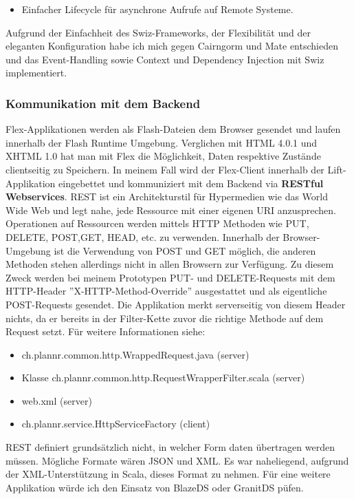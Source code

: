 \begin{itemize}
\begin{itemize}
\begin{lstlisting}[caption=Swiz: Event Observer]
[Mediate( event="Events.SEARCH_USERS", 
          properties="term" )]
public function searchUsers( term:String) : void
{
//...
}
\end{lstlisting}
Hier wird das Property term des geworfenen Events zus\"atzlich der Methode als Argument \"ubergeben.
\item Einfacher Lifecycle f\"ur asynchrone Aufrufe auf Remote Systeme.
\end{itemize}
\end{itemize}

Aufgrund der Einfachheit des Swiz-Frameworks, der Flexibilit\"at und der eleganten Konfiguration habe ich mich gegen Cairngorm und Mate entschieden und das Event-Handling sowie Context und Dependency Injection mit Swiz implementiert.

\subsubsection{Kommunikation mit dem Backend}
Flex-Applikationen werden als Flash-Dateien dem Browser gesendet und laufen innerhalb der Flash Runtime Umgebung. Verglichen mit HTML 4.0.1 und XHTML 1.0 hat man mit Flex die M\"oglichkeit, Daten respektive Zust\"ande clientseitig zu Speichern.
In meinem Fall wird der Flex-Client innerhalb der Lift-Applikation eingebettet und kommuniziert mit dem Backend via \textbf{RESTful Webservices}. REST ist ein Architekturstil f\"ur Hypermedien wie das World Wide Web und legt nahe, jede Ressource mit einer eigenen URI anzusprechen. Operationen auf Ressourcen werden mittels HTTP Methoden  wie PUT, DELETE, POST,GET, HEAD, etc. zu verwenden.\cite{wiki:rest} Innerhalb der Browser-Umgebung ist die Verwendung von POST und GET m\"oglich, die anderen Methoden stehen allerdings nicht in allen Browsern zur Verf\"ugung. Zu diesem Zweck werden bei meinem Prototypen PUT- und DELETE-Requests mit dem HTTP-Header  ''X-HTTP-Method-Override'' ausgestattet und als eigentliche POST-Requests gesendet. Die Applikation merkt serverseitig von diesem Header nichts, da er bereits in der Filter-Kette zuvor die richtige Methode auf dem Request setzt. F\"ur weitere Informationen siehe:
\begin{itemize}
\item ch.plannr.common.http.WrappedRequest.java (server)
\item Klasse ch.plannr.common.http.RequestWrapperFilter.scala (server)
\item web.xml (server)
\item ch.plannr.service.HttpServiceFactory (client)
\end{itemize}
REST definiert grunds\"atzlich nicht, in welcher Form daten \"ubertragen werden m\"ussen.  M\"ogliche Formate w\"aren JSON und XML. Es war naheliegend, aufgrund der XML-Unterst\"utzung in Scala, dieses Format zu nehmen. F\"ur eine weitere Applikation w\"urde ich den Einsatz von BlazeDS\cite{blazeDs}\cite{IntegratingBlazeDsLiftweb} oder GranitDS\cite{graniteDs} p\"ufen.

